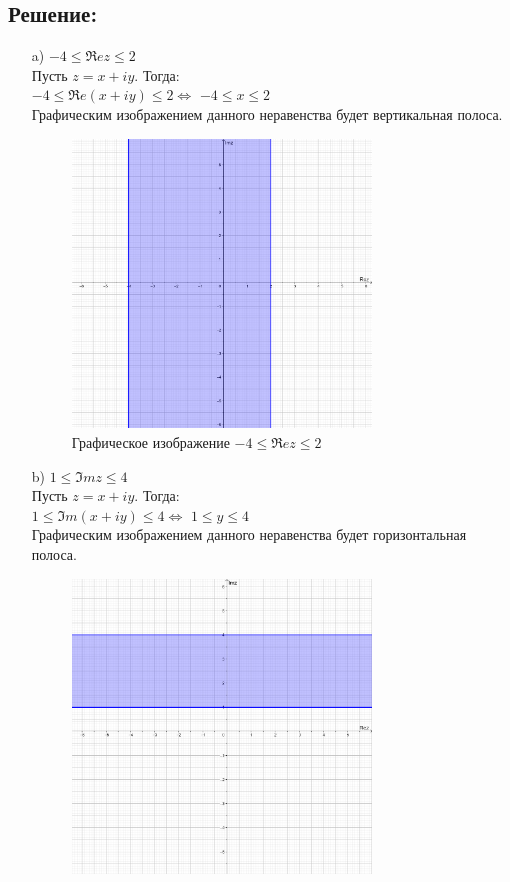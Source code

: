 \documentclass[12pt, a4paper]{article}
\begin{document}
    \subsection*{Решение:}
    \begin{enumerate}
        \item [a)] $-4 \leq \Re ez \leq 2$\\
        Пусть $z = x + iy$. Тогда:\\
        $-4 \leq \Re e(x + iy) \leq 2 \Leftrightarrow$
        $-4 \leq x \leq 2$\\
        Графическим изображением данного неравенства будет вертикальная полоса.
        \begin{figure}[h]
            \centering
            \includegraphics[width=0.75\textwidth]{task4-a.png}
            \caption{Графическое изображение $-4 \leq \Re ez \leq 2$}
        \end{figure}\newpage
        \item [b)] $1 \leq \Im mz \leq 4$\\
        Пусть $z = x + iy$. Тогда:\\
        $1 \leq \Im m(x + iy) \leq 4 \Leftrightarrow$
        $1 \leq y \leq 4$\\
        Графическим изображением данного неравенства будет горизонтальная полоса.\\
        \begin{figure}[h]
            \centering
            \includegraphics[width=0.75\textwidth]{task4-b.png}

\end{figure}
\end{enumerate}
\end{document}
